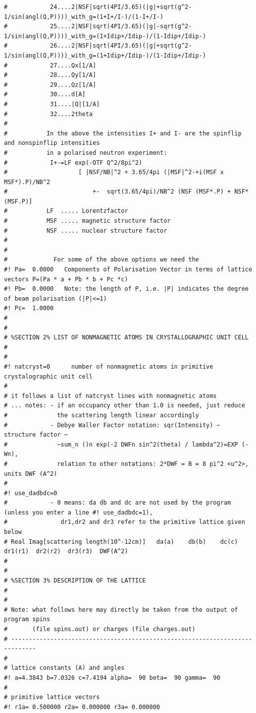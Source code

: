 {\begin{verbatim}
#            24....2|NSF|sqrt(4PI/3.65)(|g|+sqrt(g^2-1/sin(angl(Q,P))))_with_g=(1+I+/I-)/(1-I+/I-)
#            25....2|NSF|sqrt(4PI/3.65)(|g|-sqrt(g^2-1/sin(angl(Q,P))))_with_g=(1+Idip+/Idip-)/(1-Idip+/Idip-)
#            26....2|NSF|sqrt(4PI/3.65)(|g|+sqrt(g^2-1/sin(angl(Q,P))))_with_g=(1+Idip+/Idip-)/(1-Idip+/Idip-)
#            27....Qx[1/A]     
#            28....Qy[1/A]     
#            29....Qz[1/A]     
#            30....d[A]        
#            31....|Q|[1/A]    
#            32....2theta      
#
#           In the above the intensities I+ and I- are the spinflip and nonspinflip intensities
#           in a polarised neutron experiment:
#            I+-=LF exp(-OTF Q^2/8pi^2) 
#                    [ |NSF/NB|^2 + 3.65/4pi (|MSF|^2-+i(MSF x MSF*).P)/NB^2 
#                        +-  sqrt(3.65/4pi)/NB^2 (NSF (MSF*.P) + NSF* (MSF.P)]
#           LF  ..... Lorentzfactor
#           MSF ..... magnetic structure factor
#           NSF ..... nuclear structure factor
#
#
#             For some of the above options we need the
#! Pa=  0.0000   Components of Polarisation Vector in terms of lattice vectors P=(Pa * a + Pb * b + Pc *c)
#! Pb=  0.0000   Note: the length of P, i.e. |P| indicates the degree of beam polarisation (|P|<=1)
#! Pc=  1.0000
#
#
# %SECTION 2% LIST OF NONMAGNETIC ATOMS IN CRYSTALLOGRAPHIC UNIT CELL
#
#
#! natcryst=0      number of nonmagnetic atoms in primitive crystalographic unit cell
#
# it follows a list of natcryst lines with nonmagnetic atoms
# ... notes: - if an occupancy other than 1.0 is needed, just reduce 
#              the scattering length linear accordingly
#            - Debye Waller Factor notation: sqr(Intensity) ~ structure factor ~ 
#              ~sum_n ()n exp(-2 DWFn sin^2(theta) / lambda^2)=EXP (-Wn),  
#              relation to other notations: 2*DWF = B = 8 pi^2 <u^2>, units DWF (A^2)
#
#! use_dadbdc=0
#            - 0 means: da db and dc are not used by the program (unless you enter a line #! use_dadbdc=1),
#               dr1,dr2 and dr3 refer to the primitive lattice given below
# Real Imag[scattering length(10^-12cm)]   da(a)    db(b)    dc(c)    dr1(r1)  dr2(r2)  dr3(r3)  DWF(A^2)
#
#
# %SECTION 3% DESCRIPTION OF THE LATTICE
#
#
# Note: what follows here may directly be taken from the output of program spins 
#       (file spins.out) or charges (file charges.out)
# -----------------------------------------------------------------------------
#
# lattice constants (A) and angles 
#! a=4.3843 b=7.0326 c=7.4194 alpha=  90 beta=  90 gamma=  90
#
# primitive lattice vectors 
#! r1a= 0.500000 r2a= 0.000000 r3a= 0.000000

\end{verbatim}}
